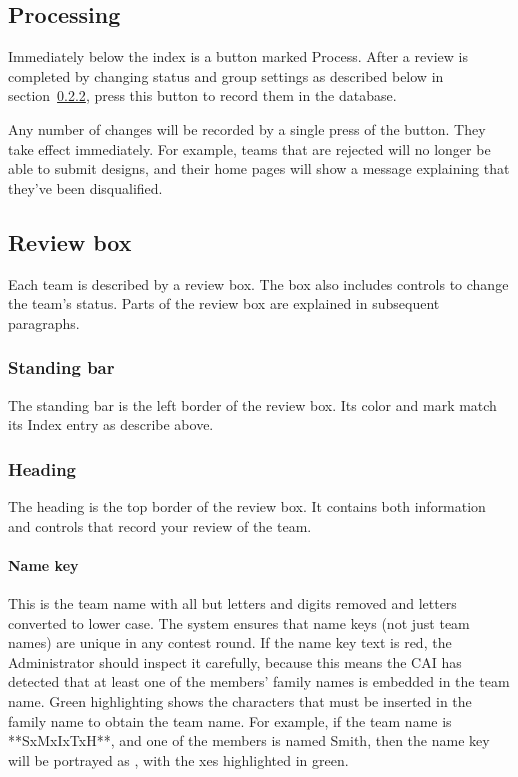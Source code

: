 \documentclass[11pt,letterpaper]{refart}
\def\ui#1{\textsf{#1}}
\begin{document}
\subsection{Processing}
Immediately below the index is a button marked \ui{Process}. After
a review is completed by changing status and group settings as
described below in section~\ref{sec:heading}, press this button to
record them in the database.

Any number of changes will be recorded by a single press of the
button. They take effect immediately. For example, teams that are
rejected will no longer be able to submit designs, and their home
pages will show a message explaining that they've been disqualified.

\subsection{Review box}
\label{sec:review_boxes}
Each team is described by a review box. The box also includes controls
to change the team's status. Parts of the review box are explained in
subsequent paragraphs.

\subsubsection{Standing bar}
The standing bar is the left border of the review box. Its color and
mark match its Index entry as describe above.

\subsubsection{Heading}
\label{sec:heading}
The heading is the top border of the review box. It contains both
information and controls that record your review of the team.

\paragraph{Name key}
This is the team name with all but letters and digits removed and
letters converted to lower case. The system ensures that name keys
(not just team names) are unique in any contest round. If the name key
text is red, the Administrator should inspect it carefully, because
this means the CAI has detected that at least one of the members'
family names is embedded in the team name. Green highlighting shows
the characters that must be inserted in the family name to obtain the
team name. For example, if the team name is \ui{**SxMxIxTxH**}, and
one of the members is named Smith, then the name key will be portrayed
as \ui{\color{red}{sxmxixtxh}}, with the \ui{x}es highlighted in
green.
\end{document}
